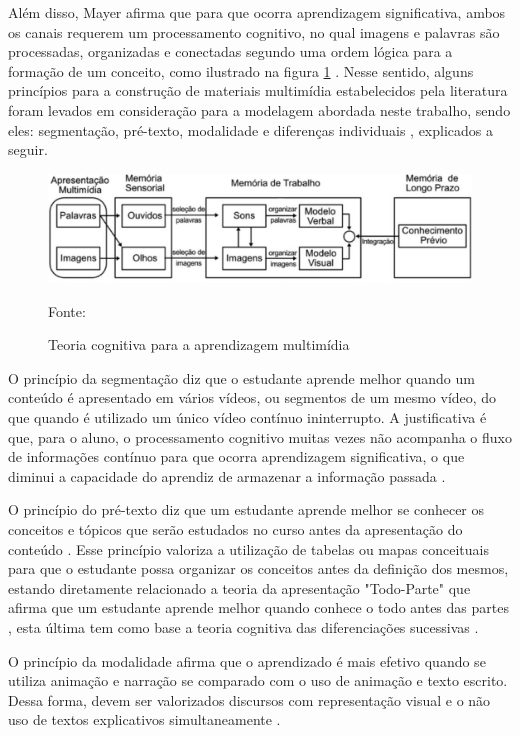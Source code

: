 Além disso, Mayer afirma que para que ocorra aprendizagem significativa, ambos os canais requerem um processamento cognitivo, no qual imagens e palavras são processadas, organizadas e conectadas segundo uma ordem lógica para a formação de um conceito, como ilustrado na figura \ref{fig:aprendizado} \cite{mayer2001, moreno2000}. Nesse sentido, alguns princípios para a construção de materiais multimídia estabelecidos pela literatura foram levados em consideração para a modelagem abordada neste trabalho, sendo eles: segmentação, pré-texto, modalidade e diferenças individuais \cite{clark2011, mayer2001, moreno2000}, explicados a seguir.

\begin{figure}[h!]
	\centering
  	\includegraphics[width=.9\linewidth]{figuras/aprendizado.eps}
  	\caption{Teoria cognitiva para a aprendizagem multimídia}
  	\small{Fonte: \cite{moreno2000}}
  	\label{fig:aprendizado}
\end{figure}

O princípio da segmentação diz que o estudante aprende melhor quando um conteúdo é apresentado em vários vídeos, ou segmentos de um mesmo vídeo, do que quando é utilizado um único vídeo contínuo ininterrupto. A justificativa é que, para o aluno, o processamento cognitivo muitas vezes não acompanha o fluxo de informações contínuo para que ocorra aprendizagem significativa, o que diminui a capacidade do aprendiz de armazenar a informação passada \cite{mayer2001, moreno2000}.

O princípio do pré-texto diz que um estudante aprende melhor se conhecer os conceitos e tópicos que serão estudados no curso antes da apresentação do conteúdo \cite{clark2011}. Esse princípio valoriza a utilização de tabelas ou mapas conceituais para que o estudante possa organizar os conceitos antes da definição dos mesmos, estando diretamente relacionado a teoria da apresentação "Todo-Parte" que afirma que um estudante aprende melhor quando conhece o todo antes das partes \cite{mayer2014, mayer2001}, esta última tem como base a teoria cognitiva das diferenciações sucessivas \cite{ausubel2000}.

O princípio da modalidade afirma que o aprendizado é mais efetivo quando se utiliza animação e narração se comparado com o uso de animação e texto escrito. Dessa forma, devem ser valorizados discursos com representação visual e o não uso de textos explicativos simultaneamente \cite{mayer2014}.

